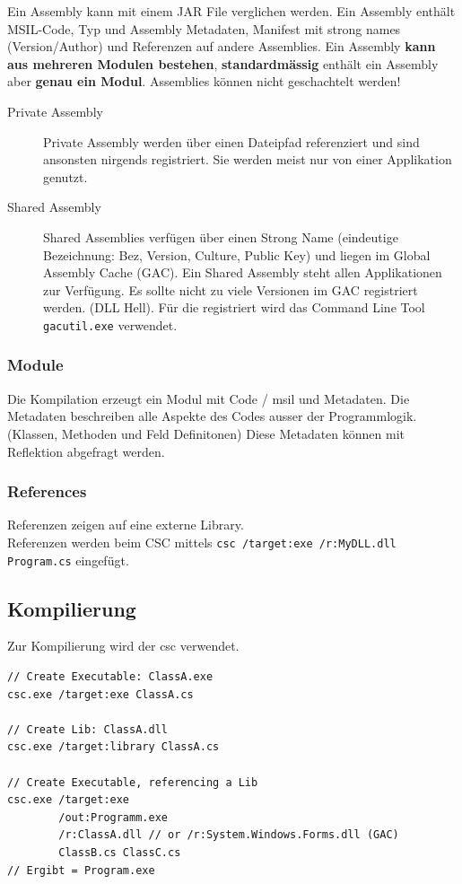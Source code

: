 \documentclass[
a4paper,
oneside,
10pt,
fleqn,
headsepline,
toc=listofnumbered, 
bibliography=totocnumbered]{scrartcl}
\begin{document}
Ein Assembly kann mit einem JAR File verglichen werden. Ein Assembly enthält MSIL-Code, Typ und Assembly Metadaten, Manifest mit strong names (Version/Author) und Referenzen auf andere Assemblies. Ein Assembly \textbf{kann aus mehreren Modulen bestehen}, \textbf{standardmässig} enthält ein Assembly aber \textbf{genau ein Modul}. Assemblies können nicht geschachtelt werden!
\begin{description}
	\item[Private Assembly] Private Assembly werden über einen Dateipfad referenziert und sind ansonsten nirgends registriert. Sie werden meist nur von einer Applikation genutzt.
	\item[Shared Assembly] Shared Assemblies verfügen über einen Strong Name (eindeutige Bezeichnung: Bez, Version, Culture, Public Key) und liegen im Global Assembly Cache (GAC). Ein Shared Assembly steht allen Applikationen zur Verfügung. Es sollte nicht zu viele Versionen im GAC registriert werden. (DLL Hell). Für die registriert wird das Command Line Tool \lstinline|gacutil.exe| verwendet.
\end{description}

\subsubsection{Module}
Die Kompilation erzeugt ein Modul mit Code / \gls{msil} und Metadaten. Die Metadaten beschreiben alle Aspekte des Codes ausser der Programmlogik. (Klassen, Methoden und Feld Definitonen) Diese Metadaten können mit Reflektion abgefragt werden.

\subsubsection{References}
Referenzen zeigen auf eine externe Library. \\
Referenzen werden beim CSC mittels \lstinline|csc /target:exe /r:MyDLL.dll Program.cs| eingefügt.


\clearpage

\subsection{Kompilierung}
Zur Kompilierung wird der \gls{csc} verwendet.  
\begin{lstlisting}
// Create Executable: ClassA.exe
csc.exe /target:exe ClassA.cs

// Create Lib: ClassA.dll
csc.exe /target:library ClassA.cs

// Create Executable, referencing a Lib
csc.exe /target:exe
		/out:Programm.exe
		/r:ClassA.dll // or /r:System.Windows.Forms.dll (GAC)
		ClassB.cs ClassC.cs
// Ergibt = Program.exe
\end{lstlisting}
\end{document}
